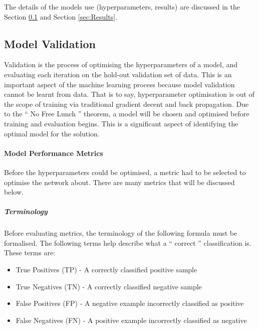 \documentclass{UoNMCHA}
\newcommand{\inlineQuote}[1]{`` #1 ''}
\newcommand{\sref}[1] {Section \ref{#1}}
\numberwithin{equation}{section}
\begin{document}
The details of the models use (hyperparameters, results) are discussed in the \sref{subsec:ModelVal} and \sref{sec:Results}.




\subsection{Model Validation}\label{subsec:ModelVal}
Validation is the process of optimising the hyperparameters of a model, and evaluating each iteration on the hold-out validation set of data. This is an important aspect of the machine learning process because model validation cannot be learnt from data. That is to say, hyperparameter optimisation is out of the scope of training via traditional gradient decent and back propagation. Due to the \inlineQuote{No Free Lunch} theorem, a model will be chosen and optimised before training and evaluation begins. This is a significant aspect of identifying the optimal model for the solution. 

\paragraph{Model Performance Metrics}
Before the hyperparameters could be optimised, a metric had to be selected to optimise the network about. There are many metrics that will be discussed below. \\

\subparagraph{Terminology} 
Before evaluating metrics, the terminology of the following formula must be formalised. The following terms help describe what a \inlineQuote{correct} classification is. These terms are:
\begin{itemize}
    \item True Positives (TP) - A correctly classified positive sample
    \item True Negatives (TN) - A correctly classified negative sample
    \item False Positives (FP) - A negative example incorrectly classified as positive
    \item False Negatives (FN) - A positive example incorrectly classified as negative
\end{itemize}
\end{document}
